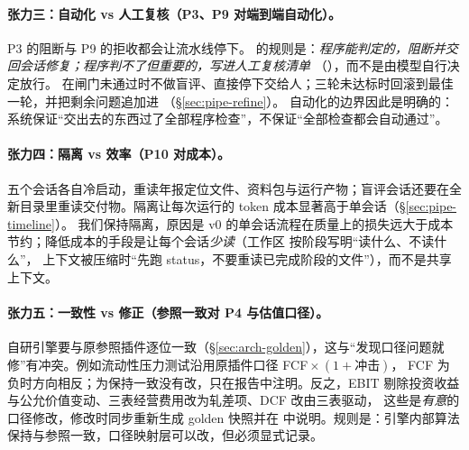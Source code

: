 \paragraph{张力三：自动化 vs 人工复核（P3、P9 对端到端自动化）。}
P3 的阻断与 P9 的拒收都会让流水线停下。\sysname{} 的规则是：\emph{程序能判定的，阻断并交回会话修复；程序判不了但重要的，写进人工复核清单}
（），而不是由模型自行决定放行。 在闸门未通过时不做盲评、直接停下交给人；三轮未达标时回滚到最佳一轮，并把剩余问题追加进 （\S\ref{sec:pipe-refine}）。
自动化的边界因此是明确的：系统保证“交出去的东西过了全部程序检查”，不保证“全部检查都会自动通过”。

\paragraph{张力四：隔离 vs 效率（P10 对成本）。}
五个会话各自冷启动，重读年报定位文件、资料包与运行产物；盲评会话还要在全新目录里重读交付物。隔离让每次运行的 token 成本显著高于单会话（\S\ref{sec:pipe-timeline}）。
我们保持隔离，原因是 v0 的单会话流程在质量上的损失远大于成本节约；降低成本的手段是让每个会话\emph{少读}（工作区  按阶段写明“读什么、不读什么”，
上下文被压缩时“先跑 status，不要重读已完成阶段的文件”），而不是共享上下文。

\paragraph{张力五：一致性 vs 修正（参照一致对 P4 与估值口径）。}
自研引擎要与原参照插件逐位一致（\S\ref{sec:arch-golden}），这与“发现口径问题就修”有冲突。例如流动性压力测试沿用原插件口径 FCF${}\times(1+\text{冲击})$，
FCF 为负时方向相反；为保持一致没有改，只在报告中注明。反之，EBIT 剔除投资收益与公允价值变动、三表经营费用改为轧差项、DCF 改由三表驱动，
这些是\emph{有意}的口径修改，修改时同步重新生成 golden 快照并在  中说明。规则是：引擎内部算法保持与参照一致，口径映射层可以改，但必须显式记录。

